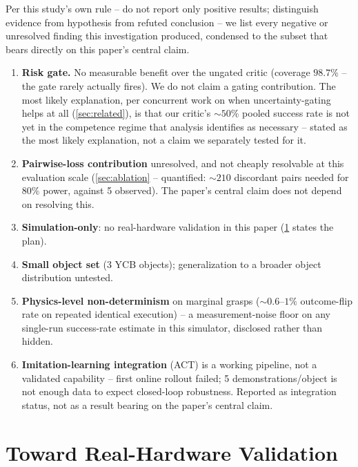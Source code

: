 \documentclass[journal]{IEEEtran}
\begin{document}
Per this study's own rule -- do not report only positive results;
distinguish evidence from hypothesis from refuted conclusion -- we list
every negative or unresolved finding this investigation produced,
condensed to the subset that bears directly on this paper's central claim.

\begin{enumerate}
\item \textbf{Risk gate.} No measurable benefit over the ungated critic
(coverage $98.7\%$ -- the gate rarely actually fires). We do not claim a
gating contribution. The most likely explanation, per concurrent work on
when uncertainty-gating helps at all \cite{gaus2026confidencegated}
(\cref{sec:related}), is that our critic's $\sim\!50\%$ pooled success rate
is not yet in the competence regime that analysis identifies as necessary
-- stated as the most likely explanation, not a claim we separately tested
for it.
\item \textbf{Pairwise-loss contribution} unresolved, and not cheaply
resolvable at this evaluation scale (\cref{sec:ablation} -- quantified:
$\sim\!210$ discordant pairs needed for $80\%$ power, against 5 observed).
The paper's central claim does not depend on resolving this.
\item \textbf{Simulation-only}: no real-hardware validation in this paper
(\cref{sec:hardware} states the plan).
\item \textbf{Small object set} (3 YCB objects); generalization to a
broader object distribution untested.
\item \textbf{Physics-level non-determinism} on marginal grasps
($\sim\!0.6$--$1\%$ outcome-flip rate on repeated identical execution) -- a
measurement-noise floor on any single-run success-rate estimate in this
simulator, disclosed rather than hidden.
\item \textbf{Imitation-learning integration} (ACT) is a working pipeline,
not a validated capability -- first online rollout failed; 5
demonstrations/object is not enough data to expect closed-loop robustness.
Reported as integration status, not as a result bearing on the paper's
central claim.
\end{enumerate}

\section{Toward Real-Hardware Validation}
\label{sec:hardware}
\end{document}
